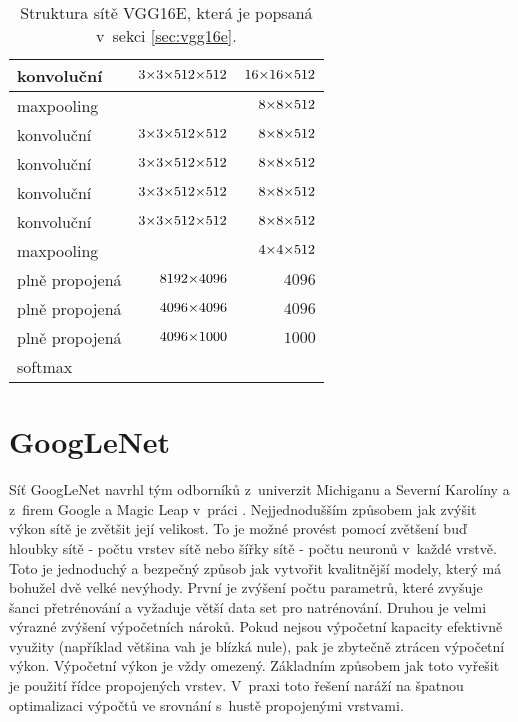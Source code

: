 \begin{table}
{\begin{tabular}{l|r|r}
    konvoluční & $\sisetup{tight-spacing=true}3{\times}3{\times}512{\times}512$ & $\sisetup{tight-spacing=true}16{\times}16{\times}512$\\
    \hline
    maxpooling &  & $\sisetup{tight-spacing=true}8{\times}8{\times}512$\\
    \hline
    konvoluční & $\sisetup{tight-spacing=true}3{\times}3{\times}512{\times}512$ & $\sisetup{tight-spacing=true}8{\times}8{\times}512$\\
    konvoluční & $\sisetup{tight-spacing=true}3{\times}3{\times}512{\times}512$ & $\sisetup{tight-spacing=true}8{\times}8{\times}512$\\
    konvoluční & $\sisetup{tight-spacing=true}3{\times}3{\times}512{\times}512$ & $\sisetup{tight-spacing=true}8{\times}8{\times}512$\\
    konvoluční & $\sisetup{tight-spacing=true}3{\times}3{\times}512{\times}512$ & $\sisetup{tight-spacing=true}8{\times}8{\times}512$\\
    \hline
    maxpooling &  & $\sisetup{tight-spacing=true}4{\times}4{\times}512$\\
    \hline
    plně propojená & $\sisetup{tight-spacing=true}8192{\times}4096$ & $4096$\\
    plně propojená & $\sisetup{tight-spacing=true}4096{\times}4096$ & $4096$\\
    plně propojená & $\sisetup{tight-spacing=true}4096{\times}1000$ & $1000$\\
    softmax &  & \\
\end{tabular}
}
\caption{Struktura sítě VGG16E, která je popsaná v~sekci \ref{sec:vgg16e}.}
\label{table:vgg16e}
\end{table}

\section{GoogLeNet}
\label{sec:googlenet}

Síť GoogLeNet navrhl tým odborníků z~univerzit Michiganu a Severní Karolíny a z~firem Google a Magic Leap v~práci \cite{Szegedy2015}.
Nejjednodušším způsobem jak zvýšit výkon sítě je zvětšit její velikost.
To je možné provést pomocí zvětšení buď hloubky sítě - počtu vrstev sítě nebo šířky sítě - počtu neuronů v~každé vrstvě.
Toto je jednoduchý a bezpečný způsob jak vytvořit kvalitnější modely, který má bohužel dvě velké nevýhody.
První je zvýšení počtu parametrů, které zvyšuje šanci přetrénování a vyžaduje větší data set pro natrénování.
Druhou je velmi výrazné zvýšení výpočetních nároků.
Pokud nejsou výpočetní kapacity efektivně využity (například většina vah je blízká nule), pak je zbytečně ztrácen výpočetní výkon.
Výpočetní výkon je vždy omezený.
Základním způsobem jak toto vyřešit je použití řídce propojených vrstev.
V~praxi toto řešení naráží na špatnou optimalizaci výpočtů ve srovnání s~hustě propojenými vrstvami.

